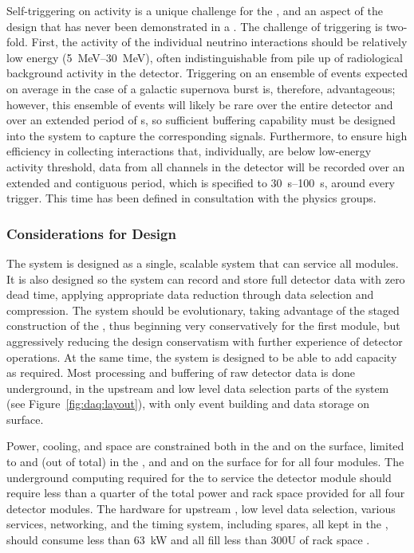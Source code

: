 Self-triggering on  activity is a unique challenge for the
 , and an aspect of the design that has never been demonstrated
in a . The challenge of  triggering is two-fold. 
First, the activity of the individual  neutrino interactions
should be relatively low energy (\SIrange{5}{30}{\mega\electronvolt}),
often indistinguishable from pile up of radiological background activity in the
detector.  Triggering on an ensemble of  events expected on
average in the case of a galactic supernova burst is, therefore,
advantageous; however, this ensemble of events will likely be rare over the
entire detector and over an extended period of \si{s}, so
sufficient buffering capability must be designed into the system to
capture the corresponding signals. 
Furthermore, to ensure high efficiency in collecting  interactions
that, individually, are below low-energy activity threshold, data from
all channels in the detector will be recorded over an extended and
contiguous period,  which is specified to \SIrange{30}{100}{\second}, around every 
trigger. This time has been defined in consultation with the 
physics groups.

 

\subsubsection{Considerations for Design}
\label{sec:daq:considerations}

The  system is designed as a single, scalable system that can
service all  modules. It is also designed so the
system can record and store full detector data with zero dead
time, applying appropriate data reduction through data selection and
compression. The system should be evolutionary, taking advantage of the
staged construction of the  , thus beginning very
conservatively for the first   module, but aggressively reducing
the design conservatism with further experience of detector
operations. At the same time, the system is designed to be able to add capacity as required. Most processing and buffering of raw
detector data is done underground, in the upstream  and low
level data selection parts of the
system (see Figure~\ref{fig:daq:layout}), with only event building and data
storage on surface.

Power, cooling, and space are constrained both in the  and on the surface, limited to \daqpower and \daqracks (out of \cucracks total) in the , and \surfdaqpower and \surfdaqracks on the surface for  for all four  modules.
The underground computing required for the  to service the 
detector module should require less than a quarter of the total power and rack space provided for all four detector modules. 
The hardware for upstream , low level data selection,
various services, networking, and the timing system, including spares,
all kept in the , 
should consume less than \SI{63}{\kilo\watt} and all fill less
than 300U of rack space \cite{bib:docdb15544}.


